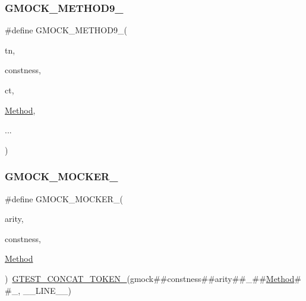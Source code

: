 \mbox{\label{_obj__test_2lib_2googletest-master_2googlemock_2include_2gmock_2gmock-generated-function-mockers_8h_aa820171a19cc587c247dbe05cbffc55f}} 
\subsubsection{\texorpdfstring{GMOCK\_METHOD9\_}{GMOCK\_METHOD9\_}}
{\footnotesize\ttfamily \#define G\+M\+O\+C\+K\+\_\+\+M\+E\+T\+H\+O\+D9\+\_\+(\begin{DoxyParamCaption}\item[{}]{tn,  }\item[{}]{constness,  }\item[{}]{ct,  }\item[{}]{\mbox{\hyperlink{_obj__test_2lib_2googletest-release-1_88_81_2googlemock_2test_2gmock-spec-builders__test_8cc_a95606368148f3e5aab5db46c32466afd}{Method}},  }\item[{}]{... }\end{DoxyParamCaption})}

\mbox{\label{_obj__test_2lib_2googletest-master_2googlemock_2include_2gmock_2gmock-generated-function-mockers_8h_a7d362499e27b1bc3a9806dd3cf58a5b7}} 
\subsubsection{\texorpdfstring{GMOCK\_MOCKER\_}{GMOCK\_MOCKER\_}}
{\footnotesize\ttfamily \#define G\+M\+O\+C\+K\+\_\+\+M\+O\+C\+K\+E\+R\+\_\+(\begin{DoxyParamCaption}\item[{}]{arity,  }\item[{}]{constness,  }\item[{}]{\mbox{\hyperlink{_obj__test_2lib_2googletest-release-1_88_81_2googlemock_2test_2gmock-spec-builders__test_8cc_a95606368148f3e5aab5db46c32466afd}{Method}} }\end{DoxyParamCaption})~\mbox{\hyperlink{_obj__test_2lib_2googletest-release-1_88_81_2googletest_2include_2gtest_2internal_2gtest-internal_8h_ae3c336cbe1ae2bd1b1d019333e4428a0}{G\+T\+E\+S\+T\+\_\+\+C\+O\+N\+C\+A\+T\+\_\+\+T\+O\+K\+E\+N\+\_\+}}(gmock\#\#constness\#\#arity\#\#\+\_\+\#\#\mbox{\hyperlink{_obj__test_2lib_2googletest-release-1_88_81_2googlemock_2test_2gmock-spec-builders__test_8cc_a95606368148f3e5aab5db46c32466afd}{Method}}\#\#\+\_\+, \+\_\+\+\_\+\+L\+I\+N\+E\+\_\+\+\_\+)}

